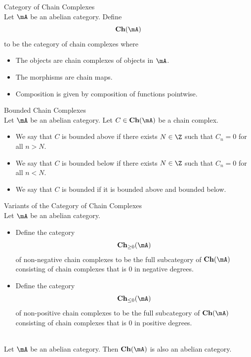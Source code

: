 \documentclass[a4paper]{article}
\begin{document}
\begin{defn}{Category of Chain Complexes}{}\\
Let $\mA$ be an abelian category. Define $$\bold{Ch}(\mA)$$ to be the category of chain complexes where 
\begin{itemize}
\item The objects are chain complexes of objects in $\mA$. 
\item The morphisms are chain maps. 
\item Composition is given by composition of functions pointwise. 
\end{itemize}
\end{defn}

\begin{defn}{Bounded Chain Complexes}{}\\
Let $\mA$ be an abelian category. Let $C\in\bold{Ch}(\mA)$ be a chain complex. 
\begin{itemize}
\item We say that $C$ is bounded above if there exists $N\in\Z$ such that $C_n=0$ for all $n>N$. 
\item We say that $C$ is bounded below if there exists $N\in\Z$ such that $C_n=0$ for all $n<N$. 
\item We say that $C$ is bounded if it is bounded above and bounded below. 
\end{itemize}
\end{defn}

\begin{defn}{Variants of the Category of Chain Complexes}{}\\
Let $\mA$ be an abelian category. 
\begin{itemize}
\item Define the category $$\bold{Ch}_{\geq 0}(\mA)$$ of non-negative chain complexes to be the full subcategory of $\bold{Ch}(\mA)$ consisting of chain complexes that is $0$ in negative degrees. 
\item Define the category $$\bold{Ch}_{\leq 0}(\mA)$$ of non-positive chain complexes to be the full subcategory of $\bold{Ch}(\mA)$ consisting of chain complexes that is $0$ in positive degrees. 
\end{itemize}
\end{defn}

\begin{prp}{}{}\\
Let $\mA$ be an abelian category. Then $\bold{Ch}(\mA)$ is also an abelian category. 
\end{prp}
\end{document}
